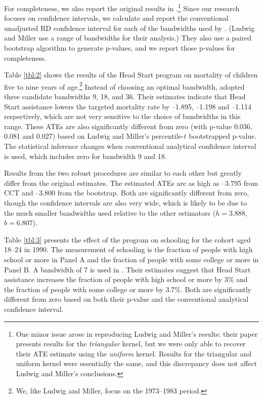 \documentclass[12pt,fleqn]{article}
\begin{document}
For completeness, we also report the
original results in \cite{ludwig2007}.\footnote{%
  One minor issue arose in reproducing Ludwig and Miller's results: their paper
  presents results for the \emph{triangular} kernel, but we were only able to
  recover their ATE estimate using the \emph{uniform} kernel. Results for the
  triangular and uniform kernel were essentially the same, and this discrepancy
  does not affect Ludwig and Miller's conclusions.} %
Since our research focuses on confidence intervals, we calculate and report
the conventional unadjusted RD confidence interval for each of the bandwidths
used by \cite{ludwig2007}. (Ludwig and Miller use a range of bandwidths
for their analysis.) They also use a paired bootstrap algorithm to generate
p-values, and we report those p-values for completeness.

Table \ref{tbl:2} shows the results of the Head Start program on mortality of
children five to nine years of age.\footnote{%
  We, like Ludwig and Miller, focus on the 1973--1983 period.} %
Instead of choosing an optimal bandwidth, \cite{ludwig2007} adopted three
candidate bandwidths 9, 18, and 36. Their estimates indicate that Head Start
assistance lowers the targeted mortality rate by --1.895, --1.198 and --1.114
respectively, which are not very sensitive to the choice of bandwidths in this
range. These ATEs are also significantly different from zero (with p-value
0.036, 0.081 and 0.027) based on Ludwig and Miller's percentile-$t$ bootstrapped
p-value. The statistical inference changes when conventional analytical
confidence interval is used, which includes zero for bandwidth 9 and 18.

Results from the two robust procedures are similar to each other but greatly
differ from the original estimates. The estimated ATEs are as high as --3.795
from CCT and --3.800 from the bootstrap. Both are significantly different from
zero, though the confidence intervals are also very wide, which is likely to be
due to the much smaller bandwidths used relative to the other estimators
($h=3.888$, $b=6.807$).

Table \ref{tbl:3} presents the effect of the program on schooling for the cohort
aged 18--24 in 1990. The measurement of schooling is the fraction of people with
high school or more in Panel A and the fraction of people with some college or
more in Panel B. A bandwidth of 7 is used in \cite{ludwig2007}. Their estimates
suggest that Head Start assistance increases the fraction of people with high
school or more by 3\% and the fraction of people with some college or more by
3.7\%. Both are significantly different from zero based on both their p-value
and the conventional analytical confidence interval.
\end{document}
